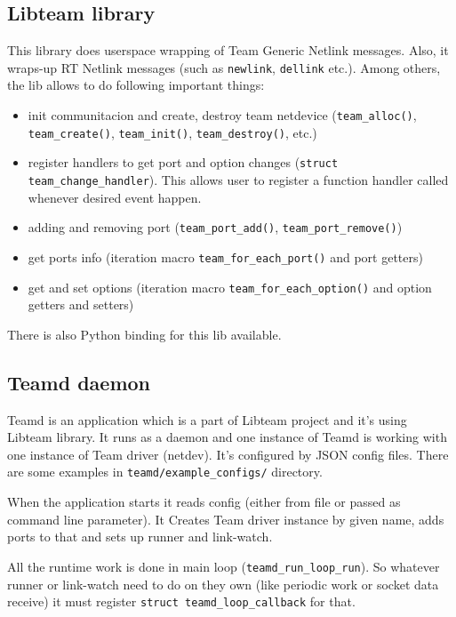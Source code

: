 \documentclass[11pt,a4paper]{article}
\begin{document}
\subsection{Libteam library}

This library does userspace wrapping of Team Generic Netlink messages. Also, it wraps-up RT Netlink messages (such as \verb+newlink+, \verb+dellink+ etc.). Among others, the lib allows to do following important things:

\begin{itemize}
\item init communitacion and create, destroy team netdevice (\verb+team_alloc()+, \verb+team_create()+, \verb+team_init()+, \verb+team_destroy()+, etc.)
\item register handlers to get port and option changes (\verb+struct team_change_handler+). This allows user to register a function handler called whenever desired event happen.
\item adding and removing port (\verb+team_port_add()+, \verb+team_port_remove()+)
\item get ports info (iteration macro \verb+team_for_each_port()+ and port getters)
\item get and set options (iteration macro \verb+team_for_each_option()+ and option getters and setters)
\end{itemize}

There is also Python binding for this lib available.

\subsection{Teamd daemon}

Teamd is an application which is a part of Libteam project and it's using Libteam library. It runs as a daemon and one instance of Teamd is working with one instance of Team driver (netdev). It's configured by JSON config files. There are some examples in \verb+teamd/example_configs/+ directory.

When the application starts it reads config (either from file or passed as command line parameter). It Creates Team driver instance by given name, adds ports to that and sets up runner and link-watch.

All the runtime work is done in main loop (\verb+teamd_run_loop_run+). So whatever runner or link-watch need to do on they own (like periodic work or socket data receive) it must register \verb+struct teamd_loop_callback+ for that.
\end{document}

